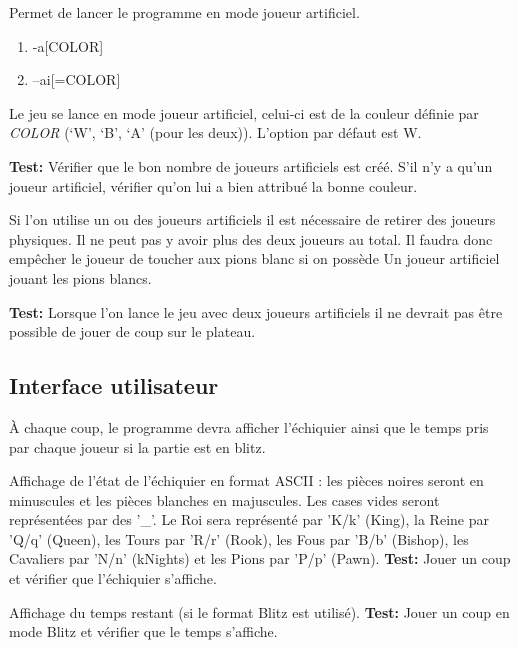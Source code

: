 \documentclass{article}
\begin{document}
\begin{needbox}[F23: Mode IA]
    Permet de lancer le programme en mode joueur artificiel.
    \begin{subneedbox}
        \begin{enumerate}
            \item -a[COLOR]
            \item --ai[=COLOR]
        \end{enumerate}
        Le jeu se lance en mode joueur artificiel, celui-ci est de la couleur
        définie par \textit{COLOR} (`W', `B', `A' (pour les deux)). L'option 
        par défaut est W.

        \textbf{Test:} Vérifier que le bon nombre de joueurs artificiels est créé. 
        S'il n'y a qu'un joueur artificiel, vérifier qu'on lui a bien attribué la bonne
        couleur.
    \end{subneedbox}
    \begin{subneedbox}
        Si l'on utilise un ou des joueurs artificiels il est nécessaire de retirer
        des joueurs physiques. Il ne peut pas y avoir plus des deux joueurs au total.
        Il faudra donc empêcher le joueur de toucher aux pions blanc si on possède Un
        joueur artificiel jouant les pions blancs.

        \textbf{Test:} Lorsque l'on lance le jeu avec deux joueurs artificiels il ne 
        devrait pas être possible de jouer de coup sur le plateau.
    \end{subneedbox}
\end{needbox}

\subsection{Interface utilisateur}

\begin{needbox}
    À chaque coup, le programme devra afficher l'échiquier ainsi que le temps pris par chaque joueur si la partie est en blitz.
    \begin{subneedbox}[F26.1: Echiquier]
        Affichage de l'état de l'échiquier en format ASCII : les pièces noires seront en minuscules et les pièces blanches en majuscules. Les cases vides seront représentées par des '\_'. Le Roi sera représenté par 'K/k' (King), la Reine par 'Q/q' (Queen), les Tours par 'R/r' (Rook), les Fous par 'B/b' (Bishop), les Cavaliers par 'N/n' (kNights) et les Pions par 'P/p' (Pawn).
        \textbf{Test:} Jouer un coup et vérifier que l'échiquier s'affiche.
    \end{subneedbox}
    \begin{subneedbox}
        Affichage du temps restant (si le format Blitz est utilisé).
        \textbf{Test:} Jouer un coup en mode Blitz et vérifier que le temps s'affiche.
    \end{subneedbox}
\end{needbox}
\end{document}
